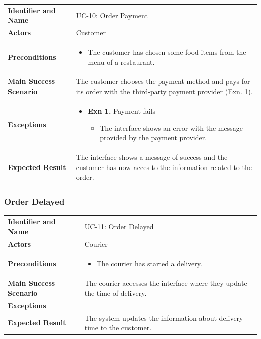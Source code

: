 \noindent
\begin{tabularx}{\textwidth}{l X}
    \textbf{Identifier and Name} & UC-10: Order Payment \\
    \textbf{Actors} & Customer \\
    \textbf{Preconditions} & 
    \begin{itemize} 
        \item The customer has chosen some food items from the menu of a restaurant.
    \end{itemize} \\
    \textbf{Main Success Scenario} & The customer chooses the payment method and pays for its order with the third-party payment provider (Exn. 1). \\
    \textbf{Exceptions} & 
    \begin{itemize} 
        \item \textbf{Exn 1.} Payment fails
        \begin{itemize}
            \item The interface shows an error with the message provided by the payment provider.
        \end{itemize}
    \end{itemize} \\
    \textbf{Expected Result} & The interface shows a message of success and the customer has now acces to the information related to the order.
\end{tabularx}

\subsubsection{Order Delayed}

\noindent
\begin{tabularx}{\textwidth}{l X}
    \textbf{Identifier and Name} & UC-11: Order Delayed \\
    \textbf{Actors} & Courier \\
    \textbf{Preconditions} & 
    \begin{itemize} 
        \item The courier has started a delivery.
    \end{itemize} \\
    \textbf{Main Success Scenario} & The courier accesses the interface where they update the time of delivery. \\
    \textbf{Exceptions} & \\
    \textbf{Expected Result} & The system updates the information about delivery time to the customer.
\end{tabularx}

